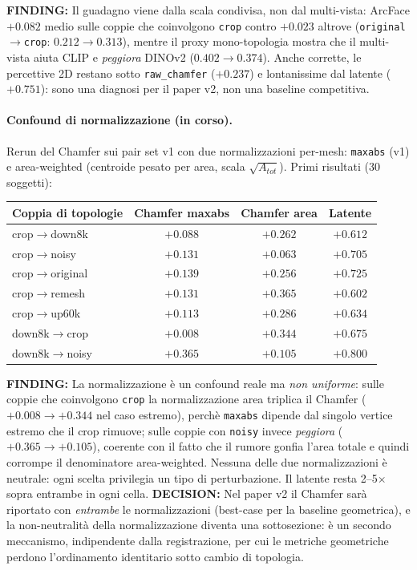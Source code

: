 \documentclass[11pt,a4paper]{article}
\newcommand{\finding}[1]{\textcolor{finding}{\textbf{FINDING:}} #1}
\newcommand{\decision}[1]{\textcolor{decision}{\textbf{DECISION:}} #1}
\begin{document}
\finding{Il guadagno viene dalla scala condivisa, non dal multi-vista: ArcFace
$+0.082$ medio sulle coppie che coinvolgono \texttt{crop} contro $+0.023$ altrove
(\texttt{original}$\to$\texttt{crop}: $0.212 \to 0.313$), mentre il proxy
mono-topologia mostra che il multi-vista aiuta CLIP e \emph{peggiora} DINOv2
($0.402 \to 0.374$). Anche corrette, le percettive 2D restano sotto \texttt{raw\_chamfer}
($+0.237$) e lontanissime dal latente ($+0.751$): sono una diagnosi per il paper v2,
non una baseline competitiva.}

\paragraph{Confound di normalizzazione (in corso).} Rerun del Chamfer sui pair set v1
con due normalizzazioni per-mesh: \texttt{maxabs} (v1) e area-weighted
(centroide pesato per area, scala $\sqrt{A_{tot}}$). Primi risultati (30 soggetti):

\begin{center}
\begin{tabular}{lccc}
\toprule
Coppia di topologie & Chamfer maxabs & Chamfer area & Latente \\
\midrule
crop$\to$down8k   & $+0.088$ & $+0.262$ & $+0.612$ \\
crop$\to$noisy    & $+0.131$ & $+0.063$ & $+0.705$ \\
crop$\to$original & $+0.139$ & $+0.256$ & $+0.725$ \\
crop$\to$remesh   & $+0.131$ & $+0.365$ & $+0.602$ \\
crop$\to$up60k    & $+0.113$ & $+0.286$ & $+0.634$ \\
down8k$\to$crop   & $+0.008$ & $+0.344$ & $+0.675$ \\
down8k$\to$noisy  & $+0.365$ & $+0.105$ & $+0.800$ \\
\bottomrule
\end{tabular}
\end{center}

\finding{La normalizzazione \`e un confound reale ma \emph{non uniforme}: sulle coppie
che coinvolgono \texttt{crop} la normalizzazione area triplica il Chamfer
($+0.008 \to +0.344$ nel caso estremo), perch\`e \texttt{maxabs} dipende dal singolo
vertice estremo che il crop rimuove; sulle coppie con \texttt{noisy} invece
\emph{peggiora} ($+0.365 \to +0.105$), coerente con il fatto che il rumore gonfia
l'area totale e quindi corrompe il denominatore area-weighted. Nessuna delle due
normalizzazioni \`e neutrale: ogni scelta privilegia un tipo di perturbazione.
Il latente resta 2--5$\times$ sopra entrambe in ogni cella.}
\decision{Nel paper v2 il Chamfer sar\`a riportato con \emph{entrambe} le
normalizzazioni (best-case per la baseline geometrica), e la non-neutralit\`a della
normalizzazione diventa una sottosezione: \`e un secondo meccanismo, indipendente
dalla registrazione, per cui le metriche geometriche perdono l'ordinamento
identitario sotto cambio di topologia.}
\end{document}
